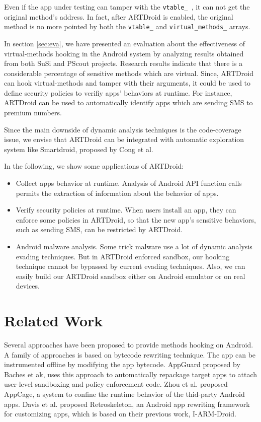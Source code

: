 Even if the app under testing can tamper with the {\tt vtable\_ }, it can not get the original method's address. In fact, after ARTDroid is enabled, the original method is no more pointed by both the {\tt vtable\_} and {\tt virtual\_methods\_} arrays. 

In section \ref{sec:eva}, we have presented an evaluation about the effectiveness of virtual-methods hooking in the Android system by analyzing results obtained from both SuSi\cite{SuSi} and PScout\cite{au2012pscout} projects. Research results indicate that there is a considerable percentage of sensitive methods which are virtual. Since, ARTDroid can hook virtual-methods and tamper with their arguments, it could be used to define security policies to verifiy apps' behaviors at runtime. For instance, ARTDroid can be used to automatically identify apps which are sending SMS to premium numbers. 

Since the main downside of dynamic analysis techniques is the code-coverage issue, we envise that ARTDroid can be integrated with automatic exploration system like Smartdroid\cite{Zheng:2012}, proposed by Cong et al. 


In the following, we show some applications of ARTDroid:

\begin{itemize}
\item Collect apps behavior at runtime. Analysis of Android API function calls permits the extraction of information about the behavior of apps.
\item Verify security policies at runtime. When users install an app, they can enforce some policies in ARTDroid, so that the new app's sensitive behaviors, such as sending SMS, can be restricted by ARTDroid.
\item Android malware analysis. Some trick malware use a lot of dynamic analysis evading techniques. But in ARTDroid enforced sandbox, our hooking technique cannot be bypassed by current evading techniques. Also, we can easily build our ARTDroid sandbox either on Android emulator or on real devices.
\end{itemize}

\section{Related Work}
\label{sec:related}
Several approaches have been proposed to provide methods hooking on Android. A family of approaches is based on bytecode rewriting technique. The app can be instrumented offline by modifying the app bytecode. AppGuard\cite{backes2013appguard} proposed by Baches et ak, uses this approach to automatically repackage target apps to attach user-level sandboxing and policy enforcement code. Zhou et al. proposed AppCage\cite{zhou2015hybrid}, a system to confine the runtime behavior of the thid-party Android apps. Davis et al. proposed Retroskeleton\cite{davis2013retroskeleton}, an Android app rewriting framework for customizing apps, which is based on their previous work, I-ARM-Droid\cite{davis2012arm}. 


